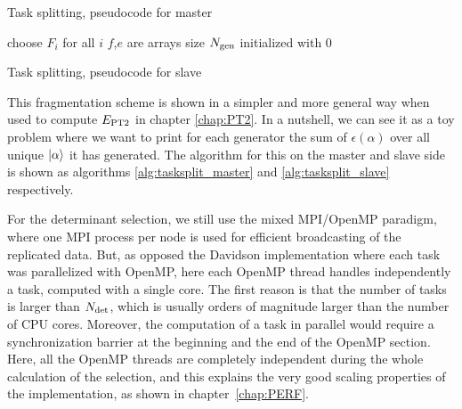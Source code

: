 \documentclass[./thesis.tex]{subfiles}
\begin{document}
\begin{algorithm}
        \caption{Task splitting, pseudocode for master}
        \label{alg:tasksplit_master}
        choose $F_i$ for all $i$\;
        $f$,$e$ are arrays size ${N_\text{gen}}$ initialized with $0$ \;
\end{algorithm}

\begin{algorithm}
        \caption{Task splitting, pseudocode for slave}
        \label{alg:tasksplit_slave}
\end{algorithm}

This fragmentation scheme is shown in a simpler and more general way when used to compute $E_\text{PT2}$ in chapter \ref{chap:PT2}. In a nutshell, we can see it as a toy problem where we want to print for each generator the sum of $\epsilon(\alpha)$ over all unique ${\ket{\alpha}}$ it has generated. The algorithm for this on the master and slave side is shown as algorithms \ref{alg:tasksplit_master} and \ref{alg:tasksplit_slave} respectively.


For the determinant selection, we still use the mixed MPI/OpenMP paradigm, where one MPI process per node is used for efficient broadcasting of the replicated data. But, as opposed the Davidson implementation where each task was parallelized with OpenMP, here each OpenMP thread handles independently a task, computed with a single core. The first reason is that the number of tasks is larger than ${N_\text{det}}$, which is usually orders of magnitude larger than the number of CPU cores. Moreover, the computation of a task in parallel would require a synchronization barrier at the beginning and the end of the OpenMP section. Here, all the OpenMP threads are completely independent during the whole calculation of the selection, and this explains the very good scaling properties of the implementation, as shown in chapter~\ref{chap:PERF}.
\end{document}
